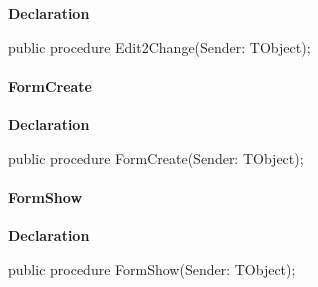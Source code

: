 \documentclass{report}
\newif\ifpdf
\begin{document}
\label{prjwizard.TfrmProjectWizard-Edit2Change}
\begin{list}{}{
\setlength{\itemindent}{0cm}
\setlength{\listparindent}{0cm}
\setlength{\leftmargin}{\evensidemargin}
\addtolength{\leftmargin}{\tmplength}
\settowidth{\labelsep}{X}
\addtolength{\leftmargin}{\labelsep}
\setlength{\labelwidth}{\tmplength}
}
\item[\textbf{Declaration}\hfill]
\ifpdf
\begin{flushleft}
\fi
\begin{ttfamily}
public procedure Edit2Change(Sender: TObject);\end{ttfamily}

\ifpdf
\end{flushleft}
\fi

\end{list}
\paragraph*{FormCreate}\hspace*{\fill}

\label{prjwizard.TfrmProjectWizard-FormCreate}
\begin{list}{}{
\setlength{\itemindent}{0cm}
\setlength{\listparindent}{0cm}
\setlength{\leftmargin}{\evensidemargin}
\addtolength{\leftmargin}{\tmplength}
\settowidth{\labelsep}{X}
\addtolength{\leftmargin}{\labelsep}
\setlength{\labelwidth}{\tmplength}
}
\item[\textbf{Declaration}\hfill]
\ifpdf
\begin{flushleft}
\fi
\begin{ttfamily}
public procedure FormCreate(Sender: TObject);\end{ttfamily}

\ifpdf
\end{flushleft}
\fi

\end{list}
\paragraph*{FormShow}\hspace*{\fill}

\label{prjwizard.TfrmProjectWizard-FormShow}
\begin{list}{}{
\setlength{\itemindent}{0cm}
\setlength{\listparindent}{0cm}
\setlength{\leftmargin}{\evensidemargin}
\addtolength{\leftmargin}{\tmplength}
\settowidth{\labelsep}{X}
\addtolength{\leftmargin}{\labelsep}
\setlength{\labelwidth}{\tmplength}
}
\item[\textbf{Declaration}\hfill]
\ifpdf
\begin{flushleft}
\fi
\begin{ttfamily}
public procedure FormShow(Sender: TObject);\end{ttfamily}

\ifpdf
\end{flushleft}
\fi

\end{list}
\end{document}
